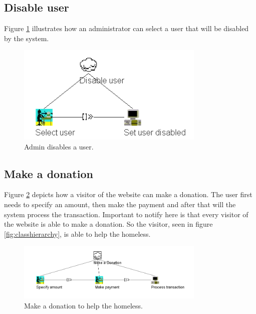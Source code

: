 \documentclass[a4paper]{report}
\begin{document}
\subsection{Disable user}
Figure \ref{fig:CTTDisable} illustrates how an administrator can select a user that will be disabled by the system.
\begin{figure}[h]
    \centering
    \includegraphics[width=0.8\textwidth]{CTT/CTTpng/CTTDisable.png}
    \caption{Admin disables a user.}
    \label{fig:CTTDisable}
\end{figure}

\subsection{Make a donation}
Figure \ref{fig:CTTDonation} depicts how a visitor of the website can make a donation. The user first needs to specify an amount, then make the payment and after that will the system process the transaction. Important to notify here is that every visitor of the website is able to make a donation. So the visitor, seen in figure \ref{fig:classhierarchy}, is able to help the homeless.
\begin{figure}[h]
    \centering
    \includegraphics[width=0.8\textwidth]{CTT/CTTpng/CTTDonation.png}
    \caption{Make a donation to help the homeless.}
    \label{fig:CTTDonation}
\end{figure}

\end{document}
